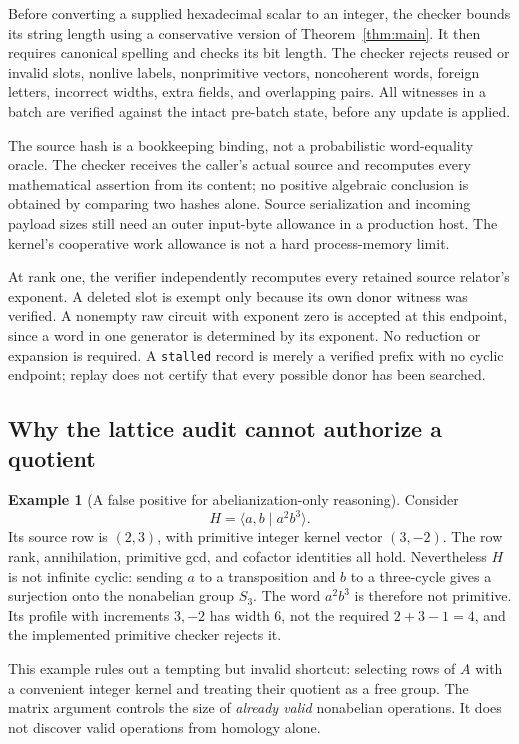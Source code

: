 \documentclass[11pt,letterpaper]{article}
\theoremstyle{definition}
\newtheorem{example}[theorem]{Example}
\theoremstyle{remark}\newtheorem{remark}[theorem]{Remark}
\newcommand{\code}[1]{\texttt{\small #1}}
\begin{document}
Before converting a supplied hexadecimal scalar to an integer, the checker
bounds its string length using a conservative version of
Theorem~\ref{thm:main}. It then requires canonical spelling and checks its bit
length. The checker rejects reused or invalid slots, nonlive labels,
nonprimitive vectors, noncoherent words, foreign letters, incorrect widths,
extra fields, and overlapping pairs. All witnesses in a batch are verified
against the intact pre-batch state, before any update is applied.

The source hash is a bookkeeping binding, not a probabilistic word-equality
oracle. The checker receives the caller's actual source and recomputes every
mathematical assertion from its content; no positive algebraic conclusion is
obtained by comparing two hashes alone. Source serialization and incoming
payload sizes still need an outer input-byte allowance in a production host.
The kernel's cooperative work allowance is not a hard process-memory limit.

At rank one, the verifier independently recomputes every retained source
relator's exponent. A deleted slot is exempt only because its own donor
witness was verified. A nonempty raw circuit with exponent zero is accepted
at this endpoint, since a word in one generator is determined by its exponent.
No reduction or expansion is required. A \code{stalled} record is merely a
verified prefix with no cyclic endpoint; replay does not certify that every
possible donor has been searched.

\subsection{Why the lattice audit cannot authorize a quotient}

\begin{example}[A false positive for abelianization-only reasoning]
\label{ex:torus}
Consider
\[
 H=\langle a,b\mid a^2b^3\rangle.
\]
Its source row is $(2,3)$, with primitive integer kernel vector $(3,-2)$.
The row rank, annihilation, primitive gcd, and cofactor identities all hold.
Nevertheless $H$ is not infinite cyclic: sending $a$ to a transposition and
$b$ to a three-cycle gives a surjection onto the nonabelian group $S_3$.
The word $a^2b^3$ is therefore not primitive. Its profile with increments
$3,-2$ has width $6$, not the required $2+3-1=4$, and the implemented
primitive checker rejects it.
\end{example}

This example rules out a tempting but invalid shortcut: selecting rows of
$A$ with a convenient integer kernel and treating their quotient as a free
group. The matrix argument controls the size of \emph{already valid}
nonabelian operations. It does not discover valid operations from homology
alone.
\end{document}

